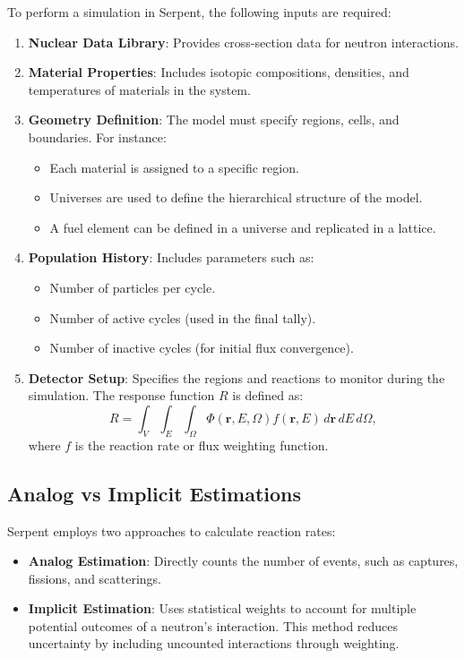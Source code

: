{To perform a simulation in Serpent, the following inputs are required:
\begin{enumerate}
    \item \textbf{Nuclear Data Library}: Provides cross-section data for neutron interactions.
    \item \textbf{Material Properties}: Includes isotopic compositions, densities, and temperatures of materials in the system.
    \item \textbf{Geometry Definition}: The model must specify regions, cells, and boundaries. For instance:
    \begin{itemize}
        \item Each material is assigned to a specific region.
        \item Universes are used to define the hierarchical structure of the model.
        \item A fuel element can be defined in a universe and replicated in a lattice.
    \end{itemize}
    \item \textbf{Population History}: Includes parameters such as:
    \begin{itemize}
        \item Number of particles per cycle.
        \item Number of active cycles (used in the final tally).
        \item Number of inactive cycles (for initial flux convergence).
    \end{itemize}
    \item \textbf{Detector Setup}: Specifies the regions and reactions to monitor during the simulation. The response function $R$ is defined as:
    \[
    R = \int_V \int_E \int_\Omega \Phi(\mathbf{r}, E, \Omega) f(\mathbf{r}, E) \, d\mathbf{r} \, dE \, d\Omega,
    \]
    where $f$ is the reaction rate or flux weighting function.
\end{enumerate}

\subsection{Analog vs Implicit Estimations}

Serpent employs two approaches to calculate reaction rates:
\begin{itemize}
    \item \textbf{Analog Estimation}: Directly counts the number of events, such as captures, fissions, and scatterings.
    \item \textbf{Implicit Estimation}: Uses statistical weights to account for multiple potential outcomes of a neutron’s interaction. This method reduces uncertainty by including uncounted interactions through weighting.
\end{itemize}

}
